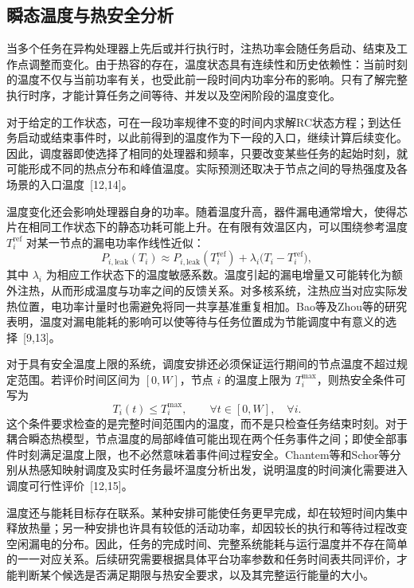 \subsection{瞬态温度与热安全分析}

当多个任务在异构处理器上先后或并行执行时，注热功率会随任务启动、结束及工作点调整而变化。由于热容的存在，温度状态具有连续性和历史依赖性：当前时刻的温度不仅与当前功率有关，也受此前一段时间内功率分布的影响。只有了解完整执行时序，才能计算任务之间等待、并发以及空闲阶段的温度变化。

对于给定的工作状态，可在一段功率规律不变的时间内求解RC状态方程；到达任务启动或结束事件时，以此前得到的温度作为下一段的入口，继续计算后续变化。因此，调度器即使选择了相同的处理器和频率，只要改变某些任务的起始时刻，就可能形成不同的热点分布和峰值温度。实际预测还取决于节点之间的导热强度及各场景的入口温度~[12,14]。

温度变化还会影响处理器自身的功率。随着温度升高，器件漏电通常增大，使得芯片在相同工作状态下的静态功耗可能上升。在有限有效温区内，可以围绕参考温度 $T_i^{\mathrm{ref}}$ 对某一节点的漏电功率作线性近似：
\begin{equation}\label{eq:ch2-temp-leak}
 P_{i,\mathrm{leak}}(T_i)
 \approx P_{i,\mathrm{leak}}(T_i^{\mathrm{ref}})
 +\lambda_i\bigl(T_i-T_i^{\mathrm{ref}}\bigr),
\end{equation}
其中 $\lambda_i$ 为相应工作状态下的温度敏感系数。温度引起的漏电增量又可能转化为额外注热，从而形成温度与功率之间的反馈关系。对多核系统，注热应当对应实际发热位置，电功率计量时也需避免将同一共享基准重复相加。Bao等及Zhou等的研究表明，温度对漏电能耗的影响可以使等待与任务位置成为节能调度中有意义的选择~[9,13]。

对于具有安全温度上限的系统，调度安排还必须保证运行期间的节点温度不超过规定范围。若评价时间区间为 $[0,W]$，节点 $i$ 的温度上限为 $T_i^{\max}$，则热安全条件可写为
\begin{equation}\label{eq:ch2-thermal-safe}
 T_i(t)\le T_i^{\max},\qquad
 \forall t\in[0,W],\quad \forall i.
\end{equation}
这个条件要求检查的是完整时间范围内的温度，而不是只检查任务结束时刻。对于耦合瞬态热模型，节点温度的局部峰值可能出现在两个任务事件之间；即使全部事件时刻满足温度上限，也不必然意味着事件间过程安全。Chantem等和Schor等分别从热感知映射调度及实时任务最坏温度分析出发，说明温度的时间演化需要进入调度可行性评价~[12,15]。

温度还与能耗目标存在联系。某种安排可能使任务更早完成，却在较短时间内集中释放热量；另一种安排也许具有较低的活动功率，却因较长的执行和等待过程改变空闲漏电的分布。因此，任务的完成时间、完整系统能耗与运行温度并不存在简单的一一对应关系。后续研究需要根据具体平台功率参数和任务时间表共同评价，才能判断某个候选是否满足期限与热安全要求，以及其完整运行能量的大小。

